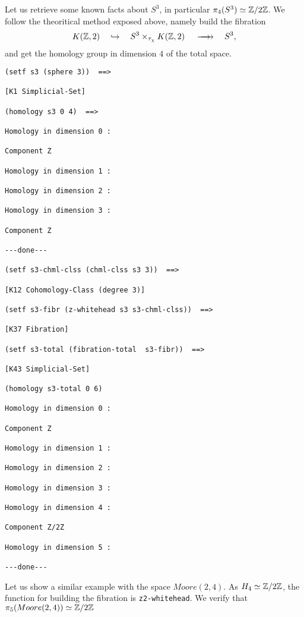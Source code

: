 Let us retrieve some known facts about $S^3$, in particular $\pi_4(S^3) \simeq {\mathbb{Z}}/{2 {\mathbb{Z}}}$.
We follow the theoritical method exposed above, namely  build the fibration
$$  K({\mathbb{Z}},2) \quad \hookrightarrow\quad  S^3 \times_{\tau_\chi} K({\mathbb{Z}},2) \hskip 1.2em
    \longrightarrow \hskip -1.2em \longrightarrow     \quad S^3,$$
and get the homology group in dimension $4$ of the total space.
{\footnotesize\begin{verbatim}
(setf s3 (sphere 3))  ==>

[K1 Simplicial-Set]

(homology s3 0 4)  ==>

Homology in dimension 0 :

Component Z

Homology in dimension 1 :

Homology in dimension 2 :

Homology in dimension 3 :

Component Z

---done---

(setf s3-chml-clss (chml-clss s3 3))  ==>

[K12 Cohomology-Class (degree 3)]

(setf s3-fibr (z-whitehead s3 s3-chml-clss))  ==>

[K37 Fibration]

(setf s3-total (fibration-total  s3-fibr))  ==>

[K43 Simplicial-Set]

(homology s3-total 0 6)

Homology in dimension 0 :

Component Z

Homology in dimension 1 :

Homology in dimension 2 :

Homology in dimension 3 :

Homology in dimension 4 :

Component Z/2Z

Homology in dimension 5 :

---done---
\end{verbatim}}
Let us show a similar example with the space $Moore(2,4)$. As $H_4 \simeq {\mathbb{Z}}/{2 {\mathbb{Z}}}$, the function
for building the fibration is {\tt z2-whitehead}.
We verify that $\pi_5(Moore(2,4))\simeq {\mathbb{Z}}/{2 {\mathbb{Z}}}$
